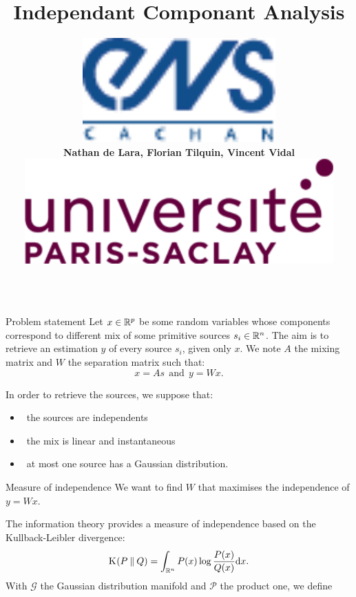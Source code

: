 \documentclass{beamer}
\title{\Huge Independant Componant Analysis}
\author[Lara, Tilquin, Vidal]
{
	\parbox{.25\textwidth}{\includegraphics[height=4cm]{ENS_cachan.pdf}}%
	\parbox{.5\textwidth}{\hfil \large \textbf{Nathan de Lara, Florian Tilquin, Vincent Vidal} \hfil}%
	\parbox{.25\textwidth}{\hspace{2cm} \includegraphics[height=4cm]{UPS.png}}%
}
\institute[Université Paris-Saclay]{\huge \textbf{Master Mathématiques, Vision et Apprentissage}}
\date{}
\newcommand{\Kl}[3][]{\mathrm K_{#1}\!\zp{#2\:\|\:#3}}
\newcommand{\zD}{\mathcal}
\begin{document}
\begin{frame}{}
	\maketitle
\begin{columns}[T]
\begin{column}{.48\linewidth}


\begin{block}{Problem statement}
Let $x\in\mathbb{R}^p$ be some random variables whose components correspond to different mix of some primitive sources $s_i\in\mathbb{R}^n$. The aim is to retrieve an estimation $y$ of every source $s_i$, given only $x$. We note $A$ the mixing matrix and $W$ the separation matrix such that:
\begin{equation}
\label{eqn:pb}
 x = A s \ \ \mbox{and} \ \ y = W x.
\end{equation}

In order to retrieve the sources, we suppose that:\begin{itemize}
\item \ the sources are independents
\item \ the mix is linear and instantaneous
\item \ at most one source has a Gaussian distribution.  
\end{itemize}
\end{block}


\begin{block}{Measure of independence}
We want to find $W$ that maximises the independence of $y=Wx$.

The information theory provides a measure of independence based on the Kullback-Leibler divergence:
\begin{equation}
  \Kl PQ = \int_{\zR^n} P(x) \log\frac{P(x)}{Q(x)} \zdx x.
\end{equation}
With $\zD G$ the Gaussian distribution manifold and $\zD P$ the product one, we define


\end{block}
\end{column}
\end{columns}
\end{frame}
\end{document}
